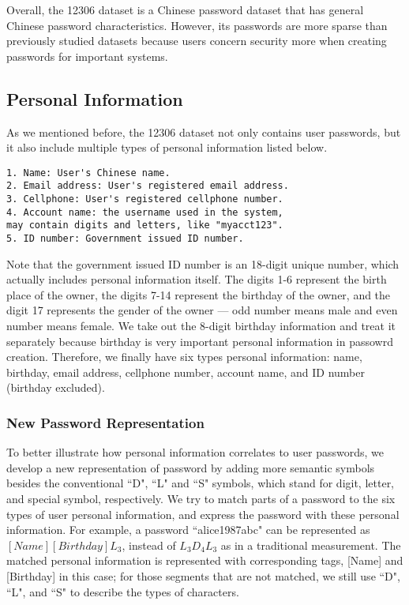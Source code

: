 Overall, the 12306 dataset is a Chinese password dataset that has general Chinese password characteristics. However, its passwords are more sparse than previously studied datasets because users concern security more when creating passwords for important systems. 

\subsection{Personal Information}
As we mentioned before, the 12306 dataset not only contains user passwords, but it also include multiple types of personal information listed below.

\begin{verbatim}
1. Name: User's Chinese name.
2. Email address: User's registered email address.
3. Cellphone: User's registered cellphone number.
4. Account name: the username used in the system, 
may contain digits and letters, like "myacct123".
5. ID number: Government issued ID number.
\end{verbatim}

Note that the government issued ID number is an 18-digit unique number, which actually includes personal information itself. The digits 1-6 represent the birth place of the owner, the digits 7-14 represent the birthday of the owner, and the digit 17 represents the gender of the owner --- odd number means male and even number means female. We take out the 8-digit birthday information and treat it separately because birthday is very important personal information in passowrd creation. Therefore, we finally have six types personal information: name, birthday, email address, cellphone number, account name, and ID number (birthday excluded). 

\subsubsection{New Password Representation}
To better illustrate how personal information correlates to user passwords, we develop a new representation of password by adding more semantic symbols besides the conventional ``D", ``L" and ``S" symbols, which stand for digit, letter, and special symbol, respectively. We try to match parts of a password to the six types of user personal information, and express the password with these personal information. For example, a password ``alice1987abc" can be represented as $[Name][Birthday]L_3$, instead of $L_3D_4L_3$ as in a traditional measurement. The matched personal information is represented with corresponding tags, [Name] and [Birthday] in this case; for those segments that are not matched, we still use ``D", ``L", and ``S" to describe the types of characters.

